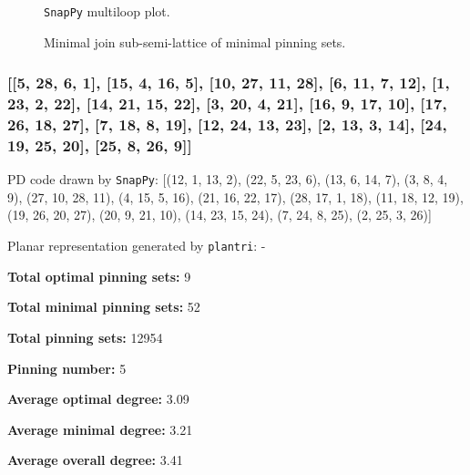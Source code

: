 \documentclass{article}%
\begin{document}
\begin{multicols}{2}
\begin{figure}[H]
\centering

\caption{\texttt{SnapPy} multiloop plot.}
\label{fig:tex/img/[[5, 10, 6, 1], [4, 18, 5, 11], [9, 28, 10, 19], [6, 15, 7, 14], [1, 22, 2, 23], [11, 23, 12, 24], [24, 3, 25, 4], [17, 19, 18, 20], [8, 16, 9, 17], [27, 15, 28, 16], [7, 27, 8, 26], [21, 13, 22, 14],.svg}
\end{figure}
\columnbreak

\begin{figure}[H]
\centering
\scalebox{0.8}{}
\caption{Minimal join sub-semi-lattice of minimal pinning sets.}
\label{fig:tex/img/[[5, 10, 6, 1], [4, 18, 5, 11], [9, 28, 10, 19], [6, 15, 7, 14], [1, 22, 2, 23], [11, 23, 12, 24], [24, 3, 25, 4], [17, 19, 18, 20], [8, 16, 9, 17], [27, 15, 28, 16], [7, 27, 8, 26], [21, 13, 22, 14],.pgf}
\end{figure}
\end{multicols}

\newpage

\subsubsection{[[5, 28, 6, 1], [15, 4, 16, 5], [10, 27, 11, 28], [6, 11, 7, 12], [1, 23, 2, 22], [14, 21, 15, 22], [3, 20, 4, 21], [16, 9, 17, 10], [17, 26, 18, 27], [7, 18, 8, 19], [12, 24, 13, 23], [2, 13, 3, 14], [24, 19, 25, 20], [25, 8, 26, 9]]}

{\small\noindent PD code drawn by \texttt{SnapPy}: [(12, 1, 13, 2), (22, 5, 23, 6), (13, 6, 14, 7), (3, 8, 4, 9), (27, 10, 28, 11), (4, 15, 5, 16), (21, 16, 22, 17), (28, 17, 1, 18), (11, 18, 12, 19), (19, 26, 20, 27), (20, 9, 21, 10), (14, 23, 15, 24), (7, 24, 8, 25), (2, 25, 3, 26)]}

{\small\noindent Planar representation generated by \texttt{plantri}: -}

\begin{multicols}{2}
{\normalsize \noindent\textbf{Total optimal pinning sets:} 9

\noindent\textbf{Total minimal pinning sets:} 52

\noindent\textbf{Total pinning sets:} 12954

\noindent\textbf{Pinning number:} 5

}
\columnbreak

{\normalsize \noindent\textbf{Average optimal degree:} 3.09

\noindent\textbf{Average minimal degree:} 3.21

\noindent\textbf{Average overall degree:} 3.41

}
\end{multicols}
\end{document}
